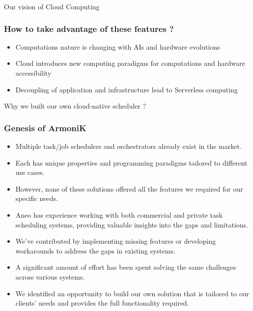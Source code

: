 \documentclass[10pt,aspectratio=1609]{beamer}
\begin{document}
\begin{section}{Our vision of Cloud Computing}
\begin{frame}
  \frametitle{How to take advantage of these features ?}

  \begin{itemize}
    \item Computations nature is changing with AIs and hardware evolutions
    \item Cloud introduces new computing paradigms for computations and hardware accessibility
    \item Decoupling of application and infrastructure lead to Serverless computing
  \end{itemize}
\end{frame}


\end{section}


\begin{section}{Why we built our own cloud-native scheduler ?}

  \begin{frame}
    \frametitle{Genesis of ArmoniK}
    \begin{itemize}
      \item Multiple task/job schedulers and orchestrators already exist in the market.
      \item Each has unique properties and programming paradigms tailored to different use cases.
      \item However, none of these solutions offered all the features we required for our specific needs.
      \item Aneo has experience working with both commercial and private task scheduling systems, providing valuable
      insights into the gaps and limitations.
      \item We’ve contributed by implementing missing features or developing workarounds to address the gaps in
      existing systems.
      \item A significant amount of effort has been spent solving the same challenges across various systems.
      \item We identified an opportunity to build our own solution that is tailored to our clients’ needs and provides the
      full functionality required.
    \end{itemize}
  \end{frame}


\end{section}
\end{document}
